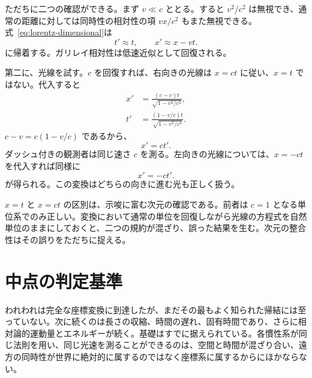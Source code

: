 ただちに二つの確認ができる。まず \(v\ll c\) ととる。すると \(v^2/c^2\) は無視でき、通常の距離に対しては同時性の相対性の項 \(vx/c^2\) もまた無視できる。式~\eqref{eq:lorentz-dimensional}は
\begin{equation}
t'\approx t,\qquad x'\approx x-vt.
\end{equation}
に帰着する。ガリレイ相対性は低速近似として回復される。

第二に、光線を試す。\(c\) を回復すれば、右向きの光線は \(x=ct\) に従い、\(x=t\) ではない。代入すると
\begin{align}
x'&=\frac{(c-v)t}{\sqrt{1-v^2/c^2}},\\
t'&=\frac{(1-v/c)t}{\sqrt{1-v^2/c^2}}.
\end{align}
\(c-v=c(1-v/c)\) であるから、
\begin{equation}
x'=ct'.
\end{equation}
ダッシュ付きの観測者は同じ速さ \(c\) を測る。左向きの光線については、\(x=-ct\) を代入すれば同様に
\begin{equation}
x'=-ct'.
\end{equation}
が得られる。この変換はどちらの向きに進む光も正しく扱う。

\(x=t\) と \(x=ct\) の区別は、示唆に富む次元の確認である。前者は \(c=1\) となる単位系でのみ正しい。変換において通常の単位を回復しながら光線の方程式を自然単位のままにしておくと、二つの規約が混ざり、誤った結果を生む。次元の整合性はその誤りをただちに捉える。

\section{中点の判定基準}

\begin{classroomqa}
\end{classroomqa}

われわれは完全な座標変換に到達したが、まだその最もよく知られた帰結には至っていない。次に続くのは長さの収縮、時間の遅れ、固有時間であり、さらに相対論的運動量とエネルギーが続く。基礎はすでに据えられている。各慣性系が同じ法則を用い、同じ光速を測ることができるのは、空間と時間が混ざり合い、遠方の同時性が世界に絶対的に属するのではなく座標系に属するからにほかならない。
